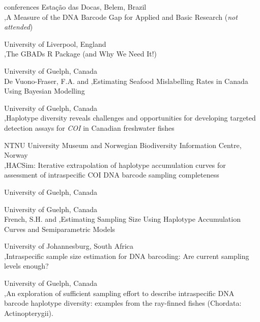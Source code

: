\begin{revlist}{conferences}
  Estação das Docas, Belem, Brazil\\
  \me \sep A Measure of the DNA Barcode Gap for Applied and Basic Research (\textit{not attended})
\item {}
  University of Liverpool, England\\
  \me \sep The GBADs R Package (and Why We Need It!)
\item {}
  University of Guelph, Canada\\
  \dsup De Vuono-Fraser, F.A. and \me \sep Estimating Seafood Mislabelling Rates in Canada Using Bayesian Modelling
\item {}
  University of Guelph, Canada\\
  \me \sep Haplotype diversity reveals challenges and opportunities for developing
  targeted detection assays for \textit{COI} in Canadian freshwater fishes
\item {}
  NTNU University Museum and Norwegian Biodiversity Information Centre, Norway\\
  \me \sep HACSim: Iterative extrapolation of haplotype accumulation curves for
  assessment of intraspecific COI DNA barcode sampling completeness
\item {}
  University of Guelph, Canada
\item {}
  University of Guelph, Canada\\
  \dsup French, S.H. and \me \sep Estimating Sampling Size Using Haplotype
  Accumulation Curves and Semiparametric Models
\item {}
  University of Johannesburg, South Africa\\
  \me \sep Intraspecific sample size estimation for DNA barcoding: Are current sampling levels enough?
\item {}
  University of Guelph, Canada\\
  \me \sep An exploration of sufficient sampling effort to describe intraspecific
  DNA barcode haplotype diversity: examples from the ray-finned fishes
  (Chordata: Actinopterygii).
\end{revlist}

